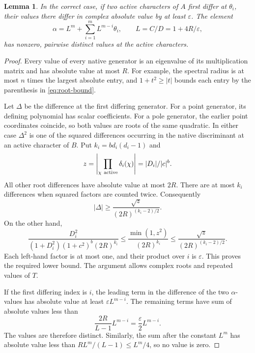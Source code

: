 \documentclass[11pt,a4paper]{article}
\newtheorem{lemma}[theorem]{Lemma}
\begin{document}
\begin{lemma}\label{lem:separate}
In the correct case, if two active characters of $A$ first
differ at $\theta_i$, their values there differ in complex
absolute value by at least $\varepsilon$. The element
\[
 \alpha=L^m+\sum_{i=1}^mL^{m-i}\theta_i,
                       \qquad L=C/D=1+4R/\varepsilon,
\]
has nonzero, pairwise distinct values at the active characters.
\end{lemma}
\begin{proof}
Every value of every native generator is an eigenvalue of its
multiplication matrix and has absolute value at most $R$.
For example, the spectral radius is at most $n$ times the
largest absolute entry, and $1+t^2\ge |t|$ bounds each entry
by the parenthesis in \eqref{eq:root-bound}.

Let $\Delta$ be the difference at the first differing generator.
For a point generator, its defining polynomial has scalar
coefficients. For a pole generator, the earlier point
coordinates coincide, so both values are roots of the same
quadratic. In either case $\Delta^2$ is one of the squared
differences occurring in the native discriminant at an active
character of $B$. Put $k_i=bd_i(d_i-1)$ and
\[
 z=\left|\prod_{\chi\ {\rm active}}\delta_i(\chi)\right|
                         =|D_i|/|c|^b.
\]
All other root differences have absolute value at most $2R$.
There are at most $k_i$ differences when squared factors are
counted twice. Consequently
\[
                  |\Delta|\ge
             \frac{\sqrt z}{(2R)^{(k_i-2)/2}}.
\]
On the other hand,
\[
 \frac{D_i^2}{(1+D_i^2)(1+c^2)^b(2R)^{k_i}}
 \le\frac{\min(1,z^2)}{(2R)^{k_i}}
 \le\frac{\sqrt z}{(2R)^{(k_i-2)/2}}.
\]
Each left-hand factor is at most one, and their product over
$i$ is $\varepsilon$. This proves the required lower bound.
The argument allows complex roots and repeated values of $T$.

If the first differing index is $i$, the leading term in the
difference of the two $\alpha$-values has absolute value at
least $\varepsilon L^{m-i}$. The remaining terms have sum
of absolute values less than
\[
       \frac{2R}{L-1}L^{m-i}
                       =\frac{\varepsilon}{2}L^{m-i}.
\]
The values are therefore distinct. Similarly, the sum after
the constant $L^m$ has absolute value less than
$RL^m/(L-1)\le L^m/4$, so no value is zero.
\end{proof}
\end{document}

